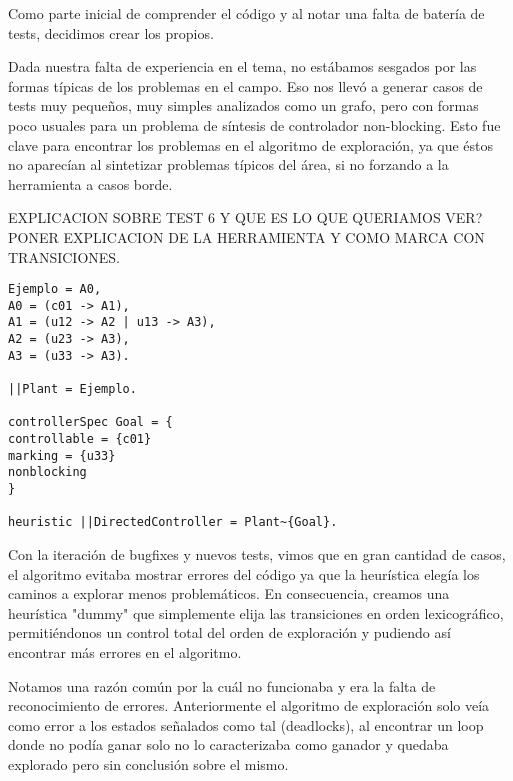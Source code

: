 
Como parte inicial de comprender el código y al notar una falta de batería de tests, decidimos crear los propios. 


Dada nuestra falta de experiencia en el tema, no estábamos sesgados por las formas típicas de los problemas en el campo. Eso nos llevó a generar casos de tests muy pequeños, muy simples analizados como un grafo, pero con formas poco usuales para un problema de síntesis de controlador non-blocking. Esto fue clave para encontrar los problemas en el algoritmo de exploración, ya que éstos no aparecían al sintetizar problemas típicos del área, si no forzando a la herramienta a casos borde.  

EXPLICACION SOBRE TEST 6 Y QUE ES LO QUE QUERIAMOS VER? PONER EXPLICACION DE LA HERRAMIENTA Y COMO MARCA CON TRANSICIONES.

\begin{lstlisting}[language = mtsa, caption=Test 1]
Ejemplo = A0,
A0 = (c01 -> A1),
A1 = (u12 -> A2 | u13 -> A3),
A2 = (u23 -> A3),
A3 = (u33 -> A3).

||Plant = Ejemplo.

controllerSpec Goal = {
controllable = {c01}
marking = {u33}
nonblocking
}

heuristic ||DirectedController = Plant~{Goal}.

\end{lstlisting}

Con la iteración de bugfixes y nuevos tests, vimos que en gran cantidad de casos, el algoritmo evitaba mostrar errores del código ya que la heurística elegía los caminos a explorar menos problemáticos. En consecuencia, creamos una heurística "dummy" que simplemente elija las transiciones en orden lexicográfico, permitiéndonos un control total del orden de exploración y pudiendo así encontrar más errores en el algoritmo.

Notamos una razón común por la cuál no funcionaba y era la falta de reconocimiento de errores. Anteriormente el algoritmo de exploración solo veía como error a los estados señalados como tal (deadlocks), al encontrar un loop donde no podía ganar solo no lo caracterizaba como ganador y quedaba explorado pero sin conclusión sobre el mismo.

